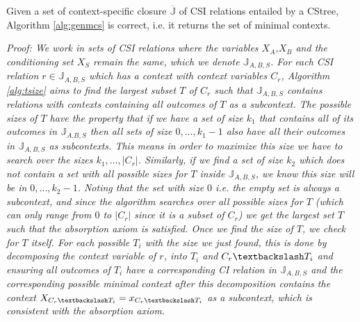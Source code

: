 \documentclass{tufte-book}
\begin{document}
\begin{theorem}\label{alg:genmcscorrectness}
Given a set of context-specific closure $\mathbb{\overline{J}}$ of CSI relations entailed by a CStree, Algorithm \ref{alg:genmcs} is correct, i.e. it returns the set of minimal contexts.
\end{theorem}


\textit{Proof: We work in sets of CSI relations where the variables $X_A$,$X_B$ and the conditioning set $X_S$ remain the same, which we denote $\mathbb{J}_{A,B,S}$. For each CSI relation $r \in \mathbb{J}_{A,B,S}$ which has a context with context variables $C_r$, Algorithm \ref{alg:tsize} aims to find the largest subset $T$ of $C_r$ such that $\mathbb{J}_{A,B,S}$ contains relations with contexts containing all outcomes of $T$ as a subcontext. The possible sizes of $T$ have the property that if we have a set of size $k_1$ that contains all of its outcomes in $\mathbb{J}_{A.B,S}$ then all sets of size $0,...,k_1-1$ also have all their outcomes in $\mathbb{J}_{A,B,S}$ as subcontexts. This means in order to maximize this size we  have to search over the sizes $k_1,...,|C_r|$. Similarly, if we find a set of size $k_2$ which does not contain a set with all possible sizes for $T$ inside $\mathbb{J}_{A,B,S}$, we know this size will be in $0,...,k_2-1$. Noting that the set with size $0$ i.e. the empty set is always a subcontext, and since the algorithm searches over all possible sizes for $T$ (which can only range from $0$ to $|C_r|$ since it is a subset of $C_r$) we get the largest set $T$ such that the absorption axiom is satisfied. Once we find the size of $T$, we check for $T$ itself. For each possible $T_i$ with the size we just found, this is done by decomposing the context variable of $r$, into $T_i$ and $C_r\textbackslash T_i$ and ensuring all outcomes of $T_i$ have a corresponding CI relation in $\mathbb{J}_{A,B,S}$ and the corresponding possible minimal context after this decomposition contains the context $X_{C_r\textbackslash T_i} = x_{C_r \textbackslash T_i}$ as a subcontext, which is consistent with the absorption axiom.}
\end{document}
